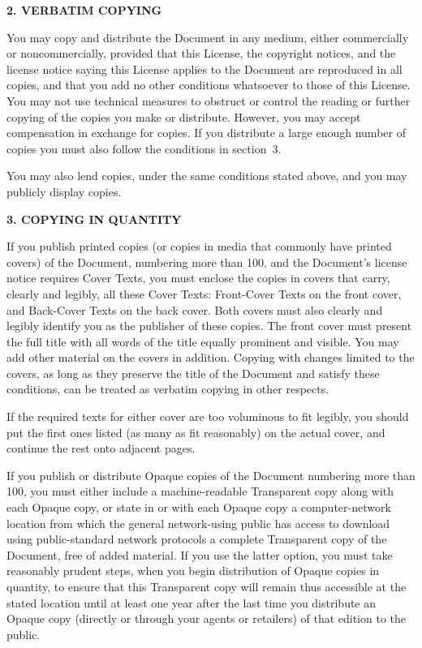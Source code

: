 \begin{center}
{\Large\bf 2. VERBATIM COPYING\par}
\end{center}

You may copy and distribute the Document in any medium, either
commercially or noncommercially, provided that this License, the
copyright notices, and the license notice saying this License applies
to the Document are reproduced in all copies, and that you add no other
conditions whatsoever to those of this License.  You may not use
technical measures to obstruct or control the reading or further
copying of the copies you make or distribute.  However, you may accept
compensation in exchange for copies.  If you distribute a large enough
number of copies you must also follow the conditions in section~3.

You may also lend copies, under the same conditions stated above, and
you may publicly display copies.


\begin{center}
{\Large\bf 3. COPYING IN QUANTITY\par}
\end{center}


If you publish printed copies (or copies in media that commonly have
printed covers) of the Document, numbering more than 100, and the
Document's license notice requires Cover Texts, you must enclose the
copies in covers that carry, clearly and legibly, all these Cover
Texts: Front-Cover Texts on the front cover, and Back-Cover Texts on
the back cover.  Both covers must also clearly and legibly identify
you as the publisher of these copies.  The front cover must present
the full title with all words of the title equally prominent and
visible.  You may add other material on the covers in addition.
Copying with changes limited to the covers, as long as they preserve
the title of the Document and satisfy these conditions, can be treated
as verbatim copying in other respects.

If the required texts for either cover are too voluminous to fit
legibly, you should put the first ones listed (as many as fit
reasonably) on the actual cover, and continue the rest onto adjacent
pages.

If you publish or distribute Opaque copies of the Document numbering
more than 100, you must either include a machine-readable Transparent
copy along with each Opaque copy, or state in or with each Opaque copy
a computer-network location from which the general network-using
public has access to download using public-standard network protocols
a complete Transparent copy of the Document, free of added material.
If you use the latter option, you must take reasonably prudent steps,
when you begin distribution of Opaque copies in quantity, to ensure
that this Transparent copy will remain thus accessible at the stated
location until at least one year after the last time you distribute an
Opaque copy (directly or through your agents or retailers) of that
edition to the public.

